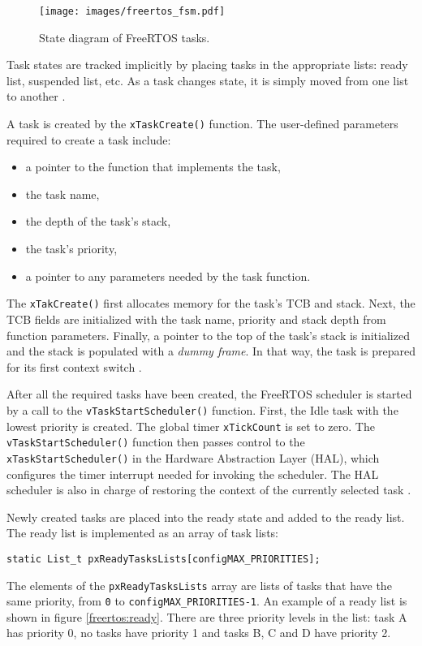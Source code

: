 \begin{figure}[ht]
    \centering
    \texttt{[image: images/freertos\_fsm.pdf]}
    \caption{State diagram of FreeRTOS tasks.}
    \label{freertos:state}
\end{figure}

Task states are tracked implicitly by placing tasks in the appropriate lists: ready list, suspended list, etc. As a task changes state, it is simply moved from one list to another 
\cite{brown2012architecture}.

A task is created by the \verb$xTaskCreate()$ function. 
The user-defined parameters required to create a task include: 
\begin{itemize}
	\item a pointer to the function that implements the task,
	\item the task name,
	\item the depth of the task's stack,
	\item the task's priority,
	\item a pointer to any parameters needed by the task function.
\end{itemize}
The \verb$xTakCreate()$ first allocates memory for the task's TCB and stack.
Next, the TCB fields are initialized with the task name, priority and stack depth from function parameters. 
Finally, a pointer to the top of the task's stack is initialized and the stack is populated with a \textit{dummy frame}. 
In that way, the task is prepared for its first context switch \cite{goyette2007analysis}.

After all the required tasks have been created, the FreeRTOS scheduler is started by a call to the 
\verb$vTaskStartScheduler()$ function. 
First, the Idle task with the lowest priority is created.
The global timer \verb$xTickCount$ is set to zero. 
The \verb$vTaskStartScheduler()$ function then passes control to the \verb$xTaskStartScheduler()$ in the Hardware Abstraction Layer (HAL), which configures the timer interrupt needed for invoking the scheduler. 
The HAL scheduler is also in charge of restoring the context of the currently selected task
\cite{goyette2007analysis}. 

Newly created tasks are placed into the ready state and added to the ready list. 
The ready list is implemented as an array of task lists:
\begin{lstlisting}[frame=none, label={lst:readylist}, caption={Ready task list}, captionpos=b]
static List_t pxReadyTasksLists[configMAX_PRIORITIES];
\end{lstlisting}
The elements of the \verb$pxReadyTasksLists$ array are lists of tasks that have the same priority, from \verb$0$ to \verb$configMAX_PRIORITIES-1$.
An example of a ready list is shown in figure \ref{freertos:ready}.
There are three priority levels in the list: task A has priority 0, no tasks have priority 1 and tasks B, C and D have priority 2. 


